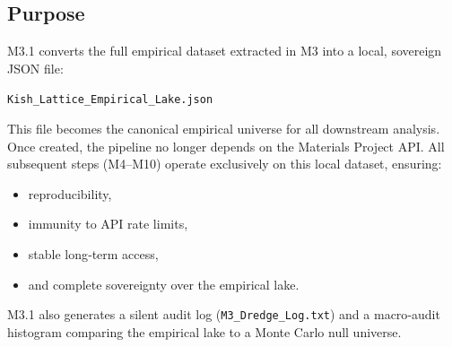 \documentclass[11pt, letterpaper, openany]{book}
\begin{document}
\subsection*{Purpose}
M3.1 converts the full empirical dataset extracted in M3 into a local, sovereign
JSON file:

\begin{center}
\texttt{Kish\_Lattice\_Empirical\_Lake.json}
\end{center}

This file becomes the canonical empirical universe for all downstream analysis.
Once created, the pipeline no longer depends on the Materials Project API.
All subsequent steps (M4–M10) operate exclusively on this local dataset,
ensuring:

\begin{itemize}
    \item reproducibility,
    \item immunity to API rate limits,
    \item stable long‑term access,
    \item and complete sovereignty over the empirical lake.
\end{itemize}

M3.1 also generates a silent audit log (\texttt{M3\_Dredge\_Log.txt}) and a
macro‑audit histogram comparing the empirical lake to a Monte Carlo null universe.
\end{document}
